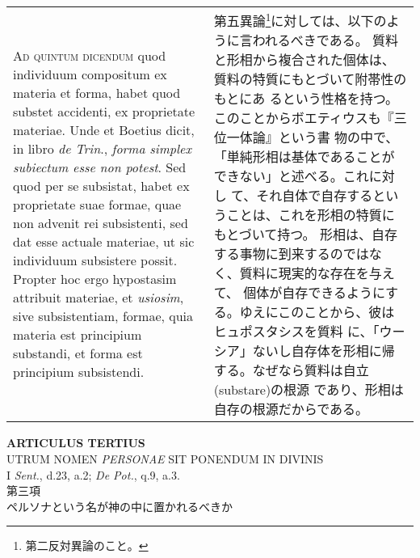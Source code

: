\documentclass[10pt]{jsarticle} %
\begin{document}
\begin{longtable}{p{21em}p{21em}}
\\



{\scshape Ad quintum dicendum} quod individuum compositum ex materia et forma,
habet quod substet accidenti, ex proprietate materiae. Unde et Boetius
dicit, in libro {\itshape de Trin}., {\itshape forma simplex subiectum esse non potest}. Sed
quod per se subsistat, habet ex proprietate suae formae, quae non
advenit rei subsistenti, sed dat esse actuale materiae, ut sic
individuum subsistere possit. Propter hoc ergo hypostasim attribuit
materiae, et {\itshape usiosim}, sive subsistentiam, formae, quia materia est
principium substandi, et forma est principium subsistendi.

&

第五異論\footnote{第二反対異論のこと。}に対しては、以下のように言われるべきである。
質料と形相から複合された個体は、質料の特質にもとづいて附帯性のもとにあ
 るという性格を持つ。このことからボエティウスも『三位一体論』という書
 物の中で、「単純形相は基体であることができない」と述べる。これに対し
 て、それ自体で自存するということは、これを形相の特質にもとづいて持つ。
 形相は、自存する事物に到来するのではなく、質料に現実的な存在を与えて、
 個体が自存できるようにする。ゆえにこのことから、彼はヒュポスタシスを質料
 に、「ウーシア」ないし自存体を形相に帰する。なぜなら質料は自立(substare)の根源
 であり、形相は自存の根源だからである。





\end{longtable}
\newpage





\begin{center}
 {\Large {\bf ARTICULUS TERTIUS}}\\
 {\large UTRUM NOMEN {\itshape PERSONAE} SIT PONENDUM IN DIVINIS}\\
 {\footnotesize I {\itshape Sent.}, d.23, a.2; {\itshape De Pot.}, q.9, a.3.}\\
 {\Large 第三項\\ペルソナという名が神の中に置かれるべきか}
\end{center}
\end{document}
